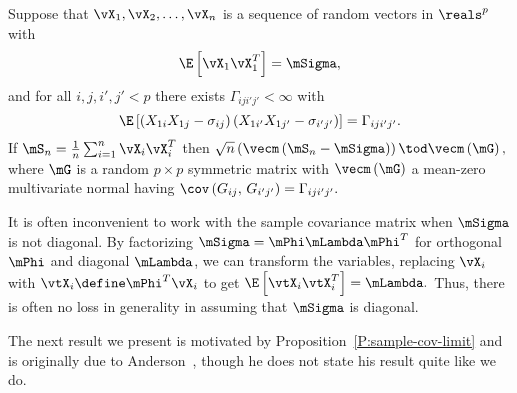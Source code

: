 \begin{proposition}\label{P:sample-cov-limit}
Suppose that 
\(
    \vX_1, \vX_2, \ldots, \vX_n
\)
is a sequence of \iid random vectors in $\reals^p$ with 
\[
    \E \left[
        \vX_1 \vX_1^T
    \right]
    =
    \mSigma,
\]
and for all $i,j,i',j' < p$ there exists 
\(
    \Gamma_{iji'j'} < \infty
\)
with
\[
    \E \left[
        \left(
            X_{1i} X_{1j}
            -
            \sigma_{ij}
        \right)
        \left(
            X_{1i'} X_{1j'}
            -
            \sigma_{i'j'}
        \right)
    \right]
    =
    \Gamma_{iji'j'}.
\]
If
\(
    \mS_n
    =
    \frac{1}{n}
    \sum_{i=1}^n
        \vX_i \vX_i^T
\)
then
\(
    \sqrt{n}
    \left(
        \vecm \left( 
            \mS_n - \mSigma 
        \right)
    \right)
    \tod
    \vecm \left( 
        \mG
    \right),
\)
where $\mG$ is a random $p \times p$ symmetric matrix with 
\(
    \vecm \left( \mG \right)
\)
a mean-zero multivariate normal having
\(
    \cov \left(
        G_{ij}, \,
        G_{i'j'}
    \right)
    =
    \Gamma_{iji'j'}.
\)
\end{proposition}

\noindent
It is often inconvenient to work with the sample covariance matrix when
\(
    \mSigma
\)
is not diagonal.  By factorizing
\(
    \mSigma
    =
    \mPhi
    \mLambda
    \mPhi^T
\)
for orthogonal $\mPhi$ and diagonal $\mLambda$, we can transform the variables, replacing 
\(
    \vX_i
\)
with 
\(
    \vtX_i
    \define
    \mPhi^T \vX_i
\)
to get
\(
    \E \left[
        \vtX_i
        \vtX_i^T
    \right]
    =
    \mLambda.
\)
Thus, there is often no loss in generality in assuming that $\mSigma$ is diagonal.

The next result we present is motivated by Proposition~\ref{P:sample-cov-limit} and is originally due to Anderson~\cite{anderson1963atp}, though he does not state his result quite like we do.  

\begin{theorem}
    
\end{theorem}


